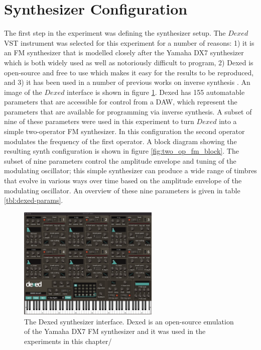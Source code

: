 \section{Synthesizer Configuration}
The first step in the experiment was defining the synthesizer setup. The $Dexed$ VST instrument was selected for this experiment for a number of reasons: 1) it is an FM synthesizer that is modelled closely after the Yamaha DX7 synthesizer which is both widely used as well as notoriously difficult to program, 2) Dexed is open-source and free to use which makes it easy for the results to be reproduced, and 3) it has been used in a number of previous works on inverse synthesis \cite{yee2018automatic, luke2019stochastic, le2021improving, masudo2021quality}. An image of the $Dexed$ interface is shown in figure \ref{fig:dexed}. Dexed has 155 automatable parameters that are accessible for control from a DAW, which represent the parameters that are available for programming via inverse synthesis. A subset of nine of these parameters were used in this experiment to turn $Dexed$ into a simple two-operator FM synthesizer. In this configuration the second operator modulates the frequency of the first operator. A block diagram showing the resulting synth configuration is shown in figure \ref{fig:two_op_fm_block}. The subset of nine parameters control the amplitude envelope and tuning of the modulating oscillator; this simple synthesizer can produce a wide range of timbres that evolve in various ways over time based on the amplitude envelope of the modulating oscillator. An overview of these nine parameters is given in table \ref{tbl:dexed-params}.

\begin{figure}[ht]
    \centering
    \includegraphics[width=0.6\textwidth]{figures/spiegelib/dexed.png}
    \caption{The Dexed synthesizer interface. Dexed is an open-source emulation of the Yamaha DX7 FM synthesizer and it was used in the experiments in this chapter/}
    \label{fig:dexed}
\end{figure}

